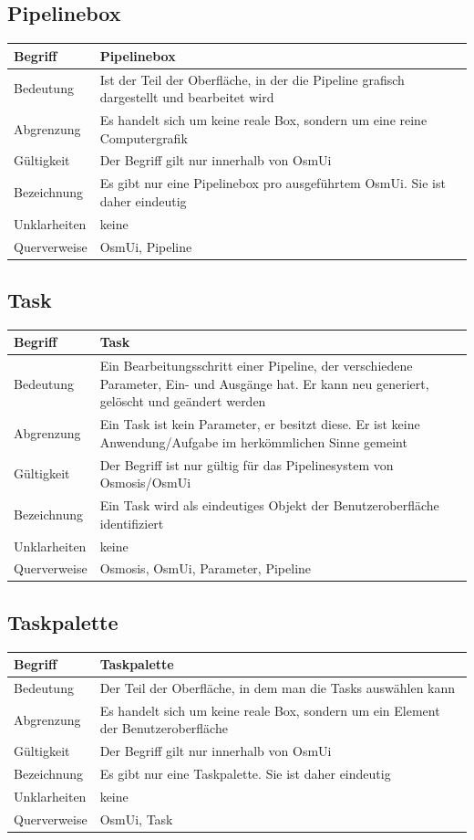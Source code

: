 \documentclass[a4paper,12pt]{scrartcl}
\begin{document}
\begin{center}
\subsection{Pipelinebox}
\begin{tabular}{|p{5cm}|p{10cm}|}
\hline Begriff & \textbf{Pipelinebox} \\ 
\hline Bedeutung & Ist der Teil der Oberfläche, in der die Pipeline grafisch dargestellt und bearbeitet wird \\ 
\hline Abgrenzung & Es handelt sich um keine reale Box, sondern um eine reine Computergrafik \\ 
\hline Gültigkeit & Der Begriff gilt nur innerhalb von OsmUi \\ 
\hline Bezeichnung & Es gibt nur eine Pipelinebox pro ausgeführtem OsmUi. Sie ist daher eindeutig \\ 
\hline Unklarheiten & keine \\ 
\hline Querverweise & OsmUi, Pipeline \\ 
\hline 
\end{tabular}
\subsection{Task}
\begin{tabular}{|p{5cm}|p{10cm}|}
\hline Begriff & \textbf{Task} \\ 
\hline Bedeutung & Ein Bearbeitungsschritt einer Pipeline, der verschiedene Parameter, Ein- und Ausgänge hat. Er kann neu generiert, gelöscht und geändert werden\\ 
\hline Abgrenzung & Ein Task ist kein Parameter, er besitzt diese. Er ist keine Anwendung/Aufgabe im herkömmlichen Sinne gemeint\\ 
\hline Gültigkeit & Der Begriff ist nur gültig für das Pipelinesystem von Osmosis/OsmUi\\ 
\hline Bezeichnung & Ein Task wird als eindeutiges Objekt der Benutzeroberfläche identifiziert\\ 
\hline Unklarheiten & keine \\ 
\hline Querverweise & Osmosis, OsmUi, Parameter, Pipeline\\ 
\hline 
\end{tabular}
\subsection{Taskpalette}
\begin{tabular}{|p{5cm}|p{10cm}|}
\hline Begriff & \textbf{Taskpalette} \\ 
\hline Bedeutung & Der Teil der Oberfläche, in dem man die Tasks auswählen kann  \\ 
\hline Abgrenzung & Es handelt sich um keine reale Box, sondern um ein Element der Benutzeroberfläche\\ 
\hline Gültigkeit & Der Begriff gilt nur innerhalb von OsmUi \\ 
\hline Bezeichnung & Es gibt nur eine Taskpalette. Sie ist daher eindeutig \\ 
\hline Unklarheiten & keine \\ 
\hline Querverweise & OsmUi, Task\\ 
\hline 
\end{tabular}

\end{center}
\end{document}
